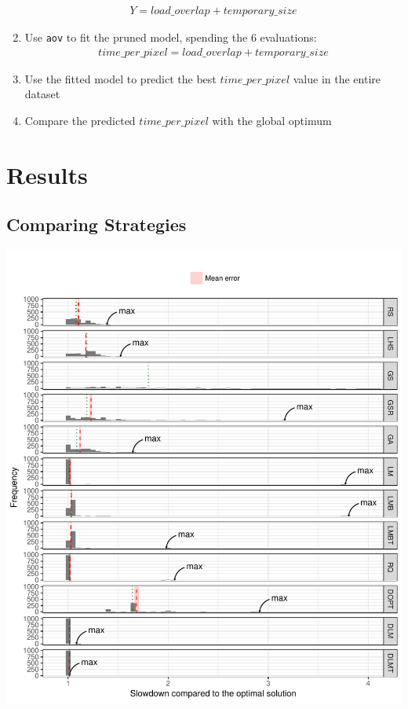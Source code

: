 \documentclass[final,12pt,a4paper]{article}
\begin{document}
\begin{enumerate}
\begin{align*}
    Y = load\_overlap + temporary\_size
\end{align*}
\item Use \texttt{aov} to fit the pruned model, spending the 6 evaluations:
\begin{align*}
      time\_per\_pixel = load\_overlap + temporary\_size
\end{align*}
\item Use the fitted model to predict the best \(time\_per\_pixel\) value in the
entire dataset
\item Compare the predicted \(time\_per\_pixel\) with the global optimum
\end{enumerate}
\section{Results}
\label{sec:orgf19e1a0}
\subsection{Comparing Strategies}
\label{sec:org01e95dd}
\begin{center}
\includegraphics[width=.9\linewidth]{../img/comparison_histogram.pdf}
\end{center}
\end{document}
